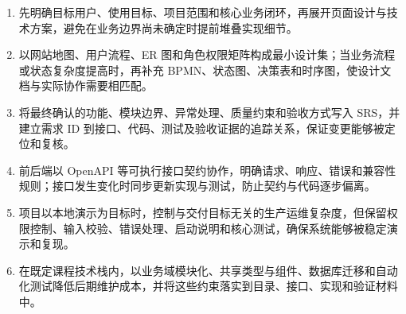 \documentclass[UTF8,a4paper,11pt]{ctexart}
\begin{document}
\begin{decisionbox}
\begin{enumerate}[label=\arabic*., leftmargin=2.2em]

\item 先明确目标用户、使用目标、项目范围和核心业务闭环，再展开页面设计与技术方案，避免在业务边界尚未确定时提前堆叠实现细节。

\item 以网站地图、用户流程、ER 图和角色权限矩阵构成最小设计集；当业务流程或状态复杂度提高时，再补充 BPMN、状态图、决策表和时序图，使设计文档与实际协作需要相匹配。

\item 将最终确认的功能、模块边界、异常处理、质量约束和验收方式写入 SRS，并建立需求 ID 到接口、代码、测试及验收证据的追踪关系，保证变更能够被定位和复核。

\item 前后端以 OpenAPI 等可执行接口契约协作，明确请求、响应、错误和兼容性规则；接口发生变化时同步更新实现与测试，防止契约与代码逐步偏离。

\item 项目以本地演示为目标时，控制与交付目标无关的生产运维复杂度，但保留权限控制、输入校验、错误处理、启动说明和核心测试，确保系统能够被稳定演示和复现。

\item 在既定课程技术栈内，以业务域模块化、共享类型与组件、数据库迁移和自动化测试降低后期维护成本，并将这些约束落实到目录、接口、实现和验证材料中。

\end{enumerate}
\end{decisionbox}
\end{document}
